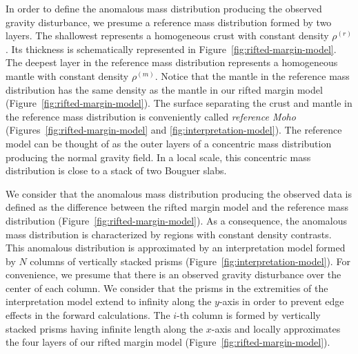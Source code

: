 \documentclass[manuscript,revised]{geophysics}
\begin{document}
In order to define the anomalous mass distribution producing the observed gravity
disturbance, we presume a reference mass distribution formed by two 
layers. The shallowest represents a homogeneous crust with constant
density $\rho^{(r)}$. Its thickness is schematically represented in
Figure~\ref{fig:rifted-margin-model}.
The deepest layer in the reference mass distribution represents a homogeneous mantle
with constant density $\rho^{(m)}$. Notice that the mantle in the reference mass 
distribution has the same density as the mantle in our rifted margin model
(Figure~\ref{fig:rifted-margin-model}).
The surface separating the crust and mantle in the reference mass distribution 
is conveniently called \textit{reference Moho} (Figures~\ref{fig:rifted-margin-model} 
and \ref{fig:interpretation-model}).
The reference model can be thought of as the outer layers of a concentric
mass distribution producing the normal gravity field.
In a local scale, this concentric mass distribution is close to a 
stack of two Bouguer slabs.

We consider that the anomalous mass distribution producing the observed data
is defined as the difference between the rifted margin model 
and the reference mass distribution (Figure~\ref{fig:rifted-margin-model}).
As a consequence, the anomalous mass distribution is characterized by regions
with constant density contrasts.
This anomalous distribution is approximated by an interpretation model 
formed by $N$ columns of vertically stacked prisms 
(Figure~\ref{fig:interpretation-model}).
For convenience, we presume that there is an observed gravity disturbance over the
center of each column.
We consider that the prisms in the extremities of the interpretation model extend to
infinity along the $y$-axis in order to prevent edge effects in the forward 
calculations. 
The $i$-th column is formed by vertically stacked prisms having infinite length along 
the $x$-axis and locally approximates the four layers of our rifted margin model
(Figure~\ref{fig:rifted-margin-model}).
\end{document}
